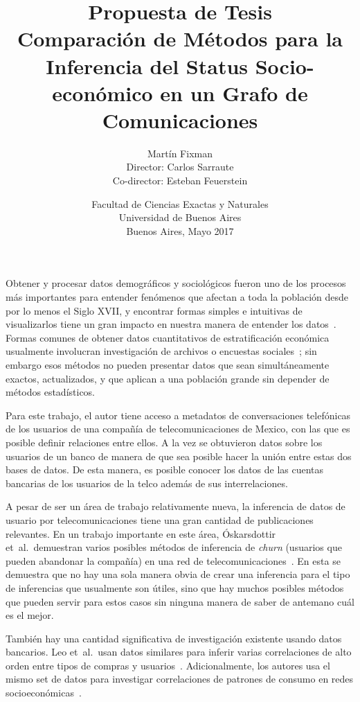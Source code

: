 \documentclass{article}
\title{Propuesta de Tesis\\\vspace{1em}\Large 
Comparación de Métodos para la Inferencia
del Status Socio-económico en un Grafo de Comunicaciones}
\author{{\Large Martín Fixman}\\Director: Carlos Sarraute\\Co-director: Esteban Feuerstein}
\date{{Facultad de Ciencias Exactas y Naturales}\\{Universidad de Buenos Aires}\\Buenos Aires, Mayo 2017}
\begin{document}
\maketitle

\section*{}

Obtener y procesar datos demográficos y sociológicos fueron uno de los procesos más importantes para entender fenómenos que afectan a toda la población desde por lo menos el Siglo XVII, y encontrar formas simples e intuitivas de visualizarlos tiene un gran impacto en nuestra manera de entender los datos~\citep{minard1844,snow1855}. Formas comunes de obtener datos cuantitativos de estratificación económica usualmente involucran investigación de archivos o encuestas sociales~\citep{bulmer1977}; sin embargo esos métodos no pueden presentar datos que sean simultáneamente exactos, actualizados, y que aplican a una población grande sin depender de métodos estadísticos.

Para este trabajo, el autor tiene acceso a metadatos de conversaciones telefónicas de los usuarios de una compañía de telecomunicaciones de Mexico, con las que es posible definir relaciones entre ellos. A la vez se obtuvieron datos sobre los usuarios de un banco de manera de que sea posible hacer la unión entre estas dos bases de datos. De esta manera, es posible conocer los datos de las cuentas bancarias de los usuarios de la telco además de sus interrelaciones.

A pesar de ser un área de trabajo relativamente nueva, la inferencia de datos de usuario por telecomunicaciones tiene una gran cantidad de publicaciones relevantes. En un trabajo importante en este área, Óskarsdottir et~al.\ demuestran varios posibles métodos de inferencia de \emph{churn} (usuarios que pueden abandonar la compañía) en una red de telecomunicaciones~\cite{oskarsdottir2016}. En esta se demuestra que no hay una sola manera obvia de crear una inferencia para el tipo de inferencias que usualmente son útiles, sino que hay muchos posibles métodos que pueden servir para estos casos sin ninguna manera de saber de antemano cuál es el mejor.

También hay una cantidad significativa de investigación existente usando datos bancarios. Leo et~al.\ usan datos similares para inferir varias correlaciones de alto orden entre tipos de compras y usuarios~\cite{leo2015socioeconomic}. Adicionalmente, los autores usa el mismo set de datos para investigar correlaciones de patrones de consumo en redes socioeconómicas~\cite{leo2016correlations}.
\end{document}
